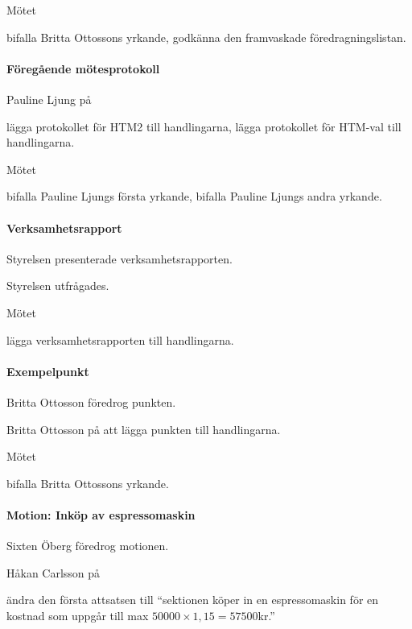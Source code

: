 \documentclass{dsekminutes}
\begin{document}
Mötet 
\begin{attlist}
  \att bifalla Britta Ottossons yrkande,
  \att godkänna den framvaskade föredragningslistan.
\end{attlist}

\paragraph{Föregående mötesprotokoll}
Pauline Ljung \yrkade på
\begin{attlist}
  \att lägga protokollet för HTM2 till handlingarna,
  \att lägga protokollet för HTM-val till handlingarna.
\end{attlist}

Mötet 
\begin{attlist}
  \att bifalla Pauline Ljungs första yrkande,
  \att bifalla Pauline Ljungs andra yrkande.
\end{attlist}

\paragraph{Verksamhetsrapport}
Styrelsen presenterade verksamhetsrapporten.

Styrelsen utfrågades.

Mötet 
\begin{attlist}
  \att lägga verksamhetsrapporten till handlingarna.
\end{attlist}

\paragraph{Exempelpunkt}
Britta Ottosson föredrog punkten.

Britta Ottosson \yrkade på att lägga punkten till handlingarna.

Mötet 
\begin{attlist}
  \att bifalla Britta Ottossons yrkande.
\end{attlist}

\paragraph{Motion: Inköp av espressomaskin}
Sixten Öberg föredrog motionen.

Håkan Carlsson  på
\begin{attlist}
  \att ändra den första attsatsen till ``sektionen köper in en
  espresso\-maskin för en kostnad som uppgår till max \(50000 \times 1,15 =
  57500\)kr.''
\end{attlist}
\end{document}
